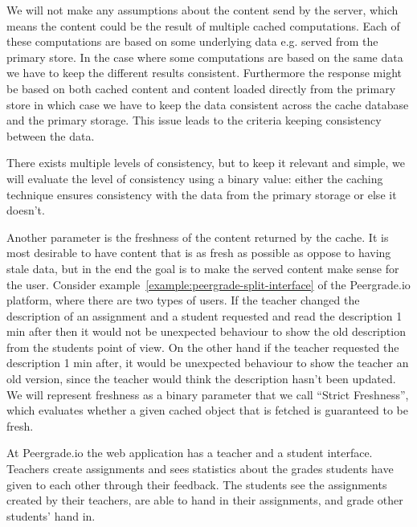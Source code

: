 
We will not make any assumptions about the content send by the server, which means the content could be the result of multiple cached computations. Each of these computations are based on some underlying data e.g. served from the primary store. In the case where some computations are based on the same data we have to keep the different results consistent. Furthermore the response might be based on both cached content and content loaded directly from the primary store in which case we have to keep the data consistent across the cache database and the primary storage. This issue leads to the criteria keeping consistency between the data.

There exists multiple levels of consistency, but to keep it relevant and simple, we will evaluate the level of consistency using a binary value: either the caching technique ensures consistency with the data from the primary storage or else it doesn't.


Another parameter is the freshness of the content returned by the cache. It is most desirable to have content that is as fresh as possible as oppose to having stale data, but in the end the goal is to make the served content make sense for the user. Consider example~\ref{example:peergrade-split-interface} of the Peergrade.io platform, where there are two types of users. If the teacher changed the description of an assignment and a student requested and read the description 1 min after then it would not be unexpected behaviour to show the old description from the students point of view. On the other hand if the teacher requested the description 1 min after, it would be unexpected behaviour to show the teacher an old version, since the teacher would think the description hasn't been updated. We will represent freshness as a binary parameter that we call ``Strict Freshness'', which evaluates whether a given cached object that is fetched is guaranteed to be fresh.

\begin{example}
\label{example:peergrade-split-interface}
At Peergrade.io the web application has a teacher and a student interface. Teachers create assignments and sees statistics about the grades students have given to each other through their feedback. The students see the assignments created by their teachers, are able to hand in their assignments, and grade other students' hand in.
\end{example}


